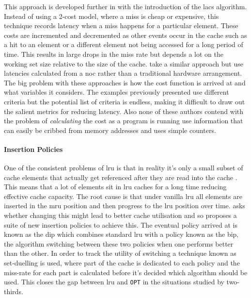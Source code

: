 This approach is developed further in \citet{kharbutliLACSLocalityAwareCostSensitive2014} with the introduction of the \gls{lacs} algorithm. Instead of using a 2-cost model, where a miss is cheap or expensive, this technique records latency when a miss happens for a particular element. These costs are incremented and decremented as other events occur in the cache such as a hit to an element or a different element not being accessed for a long period of time. This results in large drops in the miss rate but depends a lot on the working set size relative to the size of the cache. \citet{dasLatencyAwareBlock2017} take a similar approach but use latencies calculated from a \gls{noc} rather than a traditional hardware arrangement. The big problem with these approaches is how the cost function is arrived at and what variables it considers. The examples previously presented use different criteria but the potential list of criteria is endless, making it difficult to draw out the salient metrics for reducing latency. Also none of these authors contend with the problem of \emph{calculating} the cost as a program is running \citet{jeongCostsensitiveCacheReplacement2003} use information that can easily be cribbed from memory addresses and \citet{kharbutliLACSLocalityAwareCostSensitive2014} uses simple counters.

\paragraph{Insertion Policies}

One of the consistent problems of \gls{lru} is that in reality it's only a small subset of cache elements that actually get referenced after they are read into the cache \cite{qureshiAdaptiveInsertionPolicies2007}. This means that a lot of elements sit in \gls{lru} caches for a long time reducing effective cache capacity. The root cause is that under vanilla \gls{lru} all elements are inserted in the \gls{mru} position and then progress to the \gls{lru} position over time. \citeauthor{qureshiAdaptiveInsertionPolicies2007} \cite{qureshiAdaptiveInsertionPolicies2007, qureshiSetDuelingControlledAdaptiveInsertion2008} asks whether changing this might lead to better cache utilisation and so proposes a suite of new insertion policies to achieve this. The eventual policy arrived at is known as the \gls{dip} which combines standard \gls{lru} with a policy known as the \gls{bip}, the algorithm switching between these two policies when one performs better than the other. In order to track the utility of switching a technique known as set-duelling is used, where part of the cache is dedicated to each policy and the miss-rate for each part is calculated before it's decided which algorithm should be used. This closes the gap between \gls{lru} and \texttt{OPT} in the situations studied by two-thirds.

